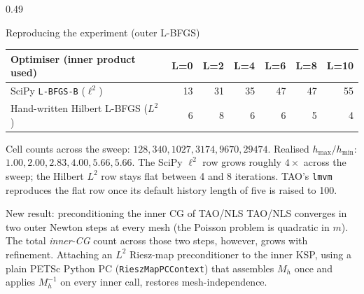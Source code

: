 \documentclass[final]{beamer}
\begin{document}
\begin{frame}[t]
\begin{columns}[t,totalwidth=\dimexpr\paperwidth-3cm\relax]
\begin{column}{0.49\dimexpr\paperwidth-3cm\relax}
\begin{block}{Reproducing the experiment (outer L-BFGS)}
\vspace{0.3em}
\centering
\begin{tabular}{lrrrrrr}
\toprule
Optimiser (inner product used) & L=0 & L=2 & L=4 & L=6 & L=8 & L=10 \\
\midrule
SciPy \texttt{L-BFGS-B} ($\ell^{2}$)          & 13 & 31 & 35 & 47 & 47 & 55 \\
Hand-written Hilbert L-BFGS ($L^{2}$)         &  6 &  8 &  6 &  6 &  5 &  4 \\
\bottomrule
\end{tabular}

\vspace{0.4em}
\raggedright
Cell counts across the sweep: $128, 340, 1027, 3174, 9670, 29474$. Realised $h_{\max}/h_{\min}$: $1.00, 2.00, 2.83, 4.00, 5.66, 5.66$. The SciPy $\ell^{2}$ row grows roughly $4\times$ across the sweep; the Hilbert $L^{2}$ row stays flat between 4 and 8 iterations. TAO's \texttt{lmvm} reproduces the flat row once its default history length of five is raised to 100.
\end{block}

\begin{alertblock}{New result: preconditioning the inner CG of TAO/NLS}
TAO/NLS converges in two outer Newton steps at every mesh (the Poisson problem is quadratic in $m$). The total \emph{inner-CG} count across those two steps, however, grows with refinement. Attaching an $L^{2}$ Riesz-map preconditioner to the inner KSP, using a plain PETSc Python PC (\texttt{RieszMapPCContext}) that assembles $M_{h}$ once and applies $M_{h}^{-1}$ on every inner call, restores mesh-independence.

\vspace{0.3em}
\centering
{}


\end{alertblock}
\end{column}
\end{columns}
\end{frame}
\end{document}
